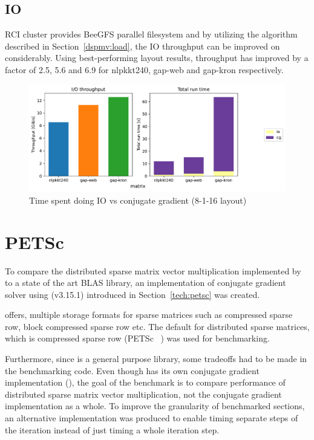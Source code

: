 \documentclass[thesis=M,english]{FITthesis}[2019/12/23]
\begin{document}
\subsection{IO}

RCI cluster provides BeeGFS parallel filesystem and by utilizing the algorithm described in
Section~\ref{dspmv:load}, the IO throughput can be improved on considerably. Using best-performing 
layout results, throughput has improved by a factor of 2.5, 5.6 and 6.9 for nlpkkt240, gap-web
and gap-kron respectively.

\begin{figure}[htp]
    \centering
    \includegraphics[scale=0.5]{static/io_mp.pdf}
    \caption{Time spent doing IO vs conjugate gradient (8-1-16 layout)}
\end{figure}

\section{PETSc}

To compare the distributed sparse matrix vector multiplication implemented by 
to a state of the art BLAS library, an
implementation of conjugate gradient solver using  (v3.15.1) introduced in
Section~\ref{tech:petsc} was created.

 offers,
multiple storage formats for sparse matrices such as compressed sparse row, block compressed
sparse row etc. The default for distributed sparse matrices, which is compressed sparse row
(PETSc ~\cite{petsc-user-ref}) was used for benchmarking.

Furthermore, since  is a general purpose library, some tradeoffs had to be made
in the benchmarking code. Even though  has its own conjugate gradient implementation
(),
the goal of the benchmark is to compare performance of distributed sparse matrix vector
multiplication, not the conjugate gradient implementation as a whole. To improve the granularity
of benchmarked sections, an alternative
implementation was produced to enable timing separate steps of the iteration instead of just
timing a whole iteration step.
\end{document}
